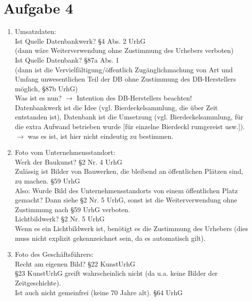 \documentclass{scrreprt}
\begin{document}
\chapter{Aufgabe 4}
\begin{anumerate}
\item 
\begin{enumerate}[label=\roman*.]
\item Umsatzdaten: \\
Ist Quelle Datenbankwerk? \hfill §4 Abs. 2 UrhG\\
(dann wäre Weiterverwendung ohne Zustimmung des Urhebers verboten)\\
Ist Quelle Datenbank? \hfill §87a Abs. 1 \\
(dann ist die Vervielfältigung/öffentlich Zugänglichmachung von Art und Umfang unwesentlichen Teil der DB ohne Zustimmung des DB-Herstellers möglich, §87b UrhG)\\
Was ist es nun? $\to$ Intention des DB-Herstellers beachten!\\
Datenbankwerk ist die Idee (vgl. Bierdeckelsammlung, die über Zeit entstanden ist), Datenbank ist die Umsetzung (vgl. Bierdeckelsammlung, für die extra Aufwand betrieben wurde [für einzelne Bierdeckl rumgereist usw.]).\\
$\to$ was es ist, ist hier nicht eindeutig zu bestimmen.
\item Foto vom Unternehmensstandort:\\
Werk der Baukunst? \hfill §2 Nr. 4 UrhG\\
Zulässig ist Bilder von Bauwerken, die bleibend an öffentlichen Plätzen sind, zu machen. \hfill §59 UrhG\\
Also: Wurde Bild des Unternehmensstandorts von einem öffentlichen Platz gemacht? Dann siehe §2 Nr. 5 UrhG, sonst ist die Weiterverwendung ohne Zustimmung nach §59 UrhG verboten.\\
Lichtbildwerk? \hfill §2 Nr. 5 UrhG\\
Wenn es ein Lichtbildwerk ist, benötigt es die Zustimmung des Urhebers (dies muss nicht explizit gekennzeichnet sein, da es automatisch gilt).
\item Foto des Geschäftsführers:\\
Recht am eigenen Bild? \hfill §22 KunstUrhG\\
§23 KunstUrhG greift wahrscheinlich nicht (da u.a. keine Bilder der Zeitgeschichte).\\
Ist auch nicht gemeinfrei (keine 70 Jahre alt). \hfill §64 UrhG\\

\end{enumerate}
\end{anumerate}
\end{document}
